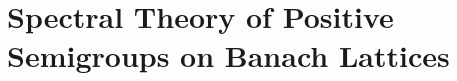 \setcounter{chapter}{2}
\chapter{Spectral Theory of Positive Semigroups on Banach Lattices}\label{chap:c3}





%
%